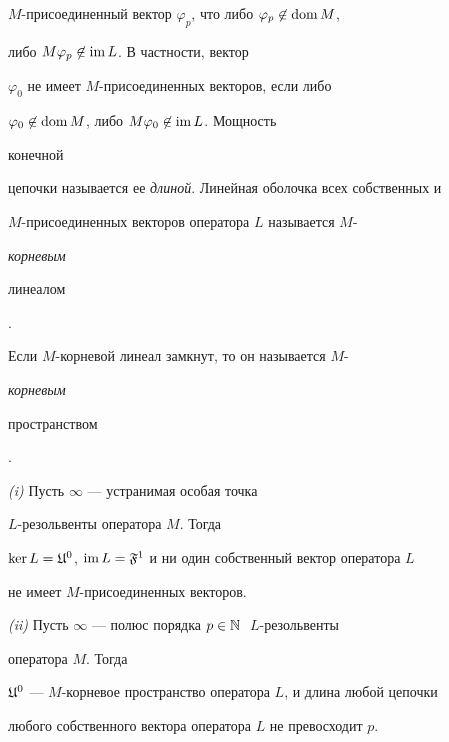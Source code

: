 $M$-присоединенный вектор $\varphi_p$, что либо $\varphi_p\not\in\operatorname{dom} M$, 


либо $M\varphi_p\not\in\operatorname{im} L$. В частности, вектор 


$\varphi_0$ не имеет $M$-присоединенных векторов, если либо 


$\varphi_0\not\in\operatorname{dom} M$, либо $M\varphi_0\not\in\operatorname{im} L$. Мощность 


конечной 


цепочки называется ее {\it длиной}. Линейная оболочка всех собственных и 


$M$-присоединенных векторов оператора $L$ называется $M$-{\it корневым 


линеалом}. 


Если $M$-корневой линеал замкнут, то он называется $M$-{\it корневым 


пространством}. 


 




\begin{thms} {\em (i)} Пусть $\infty$ --- устранимая особая точка 


$L$-резольвенты оператора $M$. Тогда 


$\ker L=\frak U^0$, $\operatorname{im} L=\frak F^1$ и ни один собственный вектор оператора $L$ 


не имеет $M$-присоединенных векторов. 


 


{\em (ii)} Пусть $\infty$ --- полюс порядка $p\in\Bbb N\;$ $L$-резольвенты 


оператора $M$. Тогда 


$\frak U^0$ --- $M$-корневое пространство оператора $L$, и длина любой цепочки 


любого собственного вектора оператора $L$ не превосходит $p$. 


\end{thms} 


 


